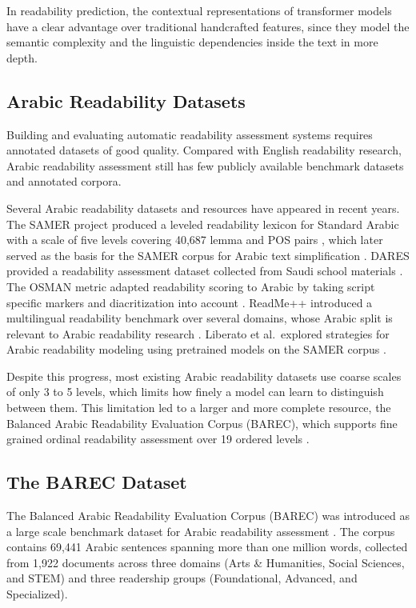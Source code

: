 \documentclass[12pt]{report}
\begin{document}
In readability prediction, the contextual representations of transformer models have a clear advantage over traditional handcrafted features, since they model the semantic complexity and the linguistic dependencies inside the text in more depth.
\subsection{Arabic Readability Datasets}

Building and evaluating automatic readability assessment systems requires annotated datasets of good quality. Compared with English readability research, Arabic readability assessment still has few publicly available benchmark datasets and annotated corpora\cite{nassiri2023approaches}.

Several Arabic readability datasets and resources have appeared in recent years. The SAMER project produced a leveled readability lexicon for Standard Arabic with a scale of five levels covering 40,687 lemma and POS pairs \cite{alkhalil2020samer}, which later served as the basis for the SAMER corpus for Arabic text simplification \cite{alhafni2024samer}. DARES provided a readability assessment dataset collected from Saudi school materials \cite{elhaj2024dares}. The OSMAN metric adapted readability scoring to Arabic by taking script specific markers and diacritization into account \cite{elhaj2016osman}. ReadMe++ introduced a multilingual readability benchmark over several domains, whose Arabic split is relevant to Arabic readability research \cite{naous2024readme}. Liberato et al.\ explored strategies for Arabic readability modeling using pretrained models on the SAMER corpus \cite{liberato2024strategies}.

Despite this progress, most existing Arabic readability datasets use coarse scales of only 3 to 5 levels, which limits how finely a model can learn to distinguish between them. This limitation led to a larger and more complete resource, the Balanced Arabic Readability Evaluation Corpus (BAREC), which supports fine grained ordinal readability assessment over 19 ordered levels \cite{elmadani2025barec}.

\subsection{The BAREC Dataset}

The Balanced Arabic Readability Evaluation Corpus (BAREC) was introduced as a large scale benchmark dataset for Arabic readability assessment \cite{elmadani2025barec}. The corpus contains 69,441 Arabic sentences spanning more than one million words, collected from 1,922 documents across three domains (Arts \& Humanities, Social Sciences, and STEM) and three readership groups (Foundational, Advanced, and Specialized).
\end{document}
